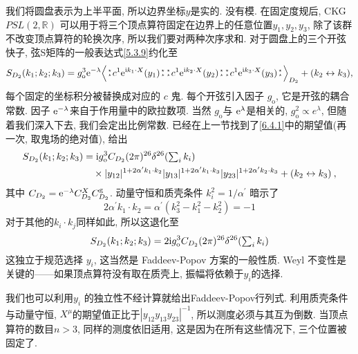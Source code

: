 我们将圆盘表示为上半平面, 所以边界坐标$y$是实的. 没有模. 在固定度规后, CKG $P S L(2, \mathds{R})$ 可以用于将三个顶点算符固定在边界上的任意位置$y_{1}, y_{2}, y_{3}$, 除了该群不改变顶点算符的轮换次序, 所以我们要对两种次序求和. 对于圆盘上的三个开弦快子, 弦S矩阵的一般表达式\eqref{5.3.9}约化至
\begin{align}
		S_{D_{2}}(k_{1} ; k_{2} ; k_{3})=g_{\mathrm{o}}^{3} \me^{-\lambda}
		\Bigl\langle \bno c^1 \me^{\mi k_{1} \cdot X}(y_{1})\bno \bno c^{1} \me^{\mi k_{2} \cdot X}(y_{2})\bno 
		\bno c^{1} \me^{\mi k_{3} \cdot X}(y_{3})\bno\Bigr\rangle_{D_{2}} 
		+(k_{2} \leftrightarrow k_{3}),  \label{6.4.1}
	\end{align}
每个固定的坐标积分被替换成对应的 $c$ 鬼. 每个开弦引入因子 $g_{\mathrm{o}}$, 它是开弦的耦合常数. 
因子 $\mathrm{e}^{-\lambda}$来自于作用量中的欧拉数项. 当然 $g_{\mathrm{o}}$与 $\mathrm{e}^{\lambda}$是相关的, $g_{\mathrm{o}}^{2} \propto e^{\lambda}$, 但随着我们深入下去, 我们会定出比例常数. 已经在上一节找到了\eqref{6.4.1}中的期望值(再一次, 取鬼场的绝对值), 给出
\begin{align}
S_{D_{2}}(k_{1} ; k_{2} ; k_{3})&= \mathrm{i} g_{\mathrm{o}}^{3} C_{D_{2}}(2 \pi)^{26} \delta^{26}({\textstyle \sum_{i} k_{i}}) \nonumber  \\
&\quad \times |y_{12}|^{1+2 \alpha^{\prime} k_{1} \cdot k_{2}}|y_{13}|^{1+2 \alpha^{\prime} k_{1} \cdot k_{3}}
|y_{23}|^{1+2 \alpha^{\prime} k_{2} \cdot k_{3}}+ (k_{2} \leftrightarrow k_{3}) \:, \label{6.4.2}
\end{align}
其中 $C_{D_{2}}=\mathrm{e}^{-\lambda} C_{D_{2}}^{X} C_{D_{2}}^{\mathrm{g}}$. 动量守恒和质壳条件 $k_{i}^{2}=1 / \alpha^{\prime}$ 暗示了
\begin{equation}
	2 \alpha^{\prime} k_{1} \cdot k_{2}=\alpha^{\prime}(k_{3}^{2}-k_{1}^{2}-k_{2}^{2})=-1 \label{6.4.3}
\end{equation}
对于其他的$k_{i} \cdot k_{j}$同样如此, 所以这退化至
\begin{equation}
	S_{D_{2}}(k_{1} ; k_{2} ; k_{3})=2 \mathrm{i} g_{\mathrm{o}}^{3} C_{D_{2}}(2 \pi)^{26} \delta^{26}({\textstyle\sum_{i} k_{i}}) \label{6.4.4}
\end{equation}
这独立于规范选择 $y_{i}$, 这当然是 Faddeev-Popov 方案的一般性质.  Weyl 不变性是关键的——如果顶点算符没有取在质壳上, 振幅将依赖于$y_{i}$的选择.

我们也可以利用$y_{i}$ 的独立性不经计算就给出Faddeev-Popov行列式. 利用质壳条件与动量守恒, 
$X^{\mu}$的期望值正比于$|y_{12} y_{13} y_{23}|^{-1}$, 所以测度必须与其互为倒数. 
当顶点算符的数目$n>3$, 同样的测度依旧适用, 这是因为在所有这些情况下, 三个位置被固定了.


